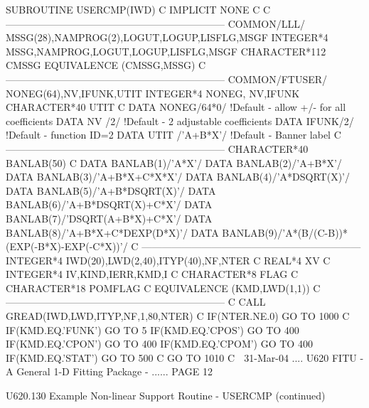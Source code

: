          SUBROUTINE USERCMP(IWD)
   C
         IMPLICIT NONE
   C
   C     ------------------------------------------------------------------
         COMMON/LLL/  MSSG(28),NAMPROG(2),LOGUT,LOGUP,LISFLG,MSGF
         INTEGER*4    MSSG,NAMPROG,LOGUT,LOGUP,LISFLG,MSGF
         CHARACTER*112 CMSSG
         EQUIVALENCE (CMSSG,MSSG)
   C     ------------------------------------------------------------------
         COMMON/FTUSER/ NONEG(64),NV,IFUNK,UTIT
         INTEGER*4      NONEG,    NV,IFUNK
         CHARACTER*40                      UTIT
   C
         DATA NONEG/64*0/     !Default - allow +/- for all coefficients
         DATA NV   /2/        !Default - 2 adjustable coefficients
         DATA IFUNK/2/        !Default - function ID=2
         DATA UTIT /'A+B*X'/  !Default - Banner label
   C     ------------------------------------------------------------------
         CHARACTER*40   BANLAB(50)
   C
         DATA BANLAB(1)/'A*X'/
         DATA BANLAB(2)/'A+B*X'/
         DATA BANLAB(3)/'A+B*X+C*X*X'/
         DATA BANLAB(4)/'A*DSQRT(X)'/
         DATA BANLAB(5)/'A+B*DSQRT(X)'/
         DATA BANLAB(6)/'A+B*DSQRT(X)+C*X'/
         DATA BANLAB(7)/'DSQRT(A+B*X)+C*X'/
         DATA BANLAB(8)/'A+B*X+C*DEXP(D*X)'/
         DATA BANLAB(9)/'A*(B/(C-B))*(EXP(-B*X)-EXP(-C*X))'/
   C     ------------------------------------------------------------------
         INTEGER*4      IWD(20),LWD(2,40),ITYP(40),NF,NTER
   C
         REAL*4         XV
   C
         INTEGER*4      IV,KIND,IERR,KMD,I
   C
         CHARACTER*8    FLAG
   C
         CHARACTER*18   POMFLAG
   C
         EQUIVALENCE    (KMD,LWD(1,1))
   C     ------------------------------------------------------------------
   C
         CALL GREAD(IWD,LWD,ITYP,NF,1,80,NTER)
   C
         IF(NTER.NE.0) GO TO 1000
   C
         IF(KMD.EQ.'FUNK') GO TO 5
         IF(KMD.EQ.'CPOS') GO TO 400
         IF(KMD.EQ.'CPON') GO TO 400
         IF(KMD.EQ.'CPOM') GO TO 400
         IF(KMD.EQ.'STAT') GO TO 500
   C
         GO TO 1010
   C
    
   31-Mar-04 .... U620  FITU - A General 1-D Fitting Package - ...... PAGE  12
 
 
   U620.130  Example Non-linear Support Routine - USERCMP (continued)
 
